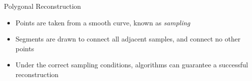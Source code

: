 \begin{frame}{Polygonal Reconstruction}
	\begin{itemize}
		\item Points are taken from a smooth curve, known as \textit{sampling}
		\item Segments are drawn to connect all adjacent samples, and connect no other points
		\item Under the correct sampling conditions, algorithms can guarantee a successful reconstruction

	\end{itemize}
\end{frame}
